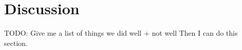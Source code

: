 \chapter{Discussion}

TODO: Give me a list of things we did well + not well
Then I can do this section.
